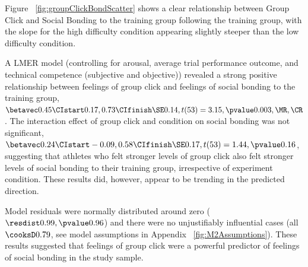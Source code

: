 Figure ~\ref{fig:groupClickBondScatter} shows a clear relationship between Group Click and Social Bonding to the training group following the training group, with the slope for the high difficulty condition appearing slightly steeper than the low difficulty condition.

A LMER model (controlling for arousal, average trial performance outcome, and technical competence (subjective and objective)) revealed a strong positive relationship between feelings of group click and feelings of social bonding to the training group,  $\betavec 0.45 \CIstart 0.17, 0.73 \CIfinish \SE 0.14, t(53) = 3.15, \pvalue 0.003, \MR , \CR  $.
The interaction effect of group click and condition on social bonding was not significant, $\betavec 0.24 \CIstart -0.09, 0.58 \CIfinish \SE 0.17, t(53) = 1.44, \pvalue 0.16$, suggesting that athletes who felt stronger levels of group click also felt stronger levels of social bonding to their training group, irrespective of experiment condition. These results did, however, appear to be trending in the predicted direction.

Model residuals were normally distributed around zero ($\resdist 0.99, \pvalue 0.96$) and there were no unjustifiably influential cases (all $\cooksD 0.79$, see model assumptions in Appendix ~\ref{fig:M2Assumptions}).  These results suggested that feelings of group click were a powerful predictor of feelings of social bonding in the study sample.




